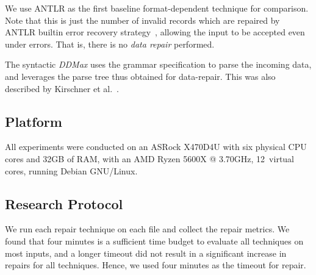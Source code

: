 \documentclass[acmsmall,screen,review,anonymous]{acmart}
\newcommand{\formatfree}{format-free\xspace}
\newcommand{\formatdependent}{format-dependent\xspace}
\newcommand{\dtask}{data repair\xspace}
\newcommand{\approach}{\textsc{$\Delta$Repair}\xspace}
\newcommand{\ddmax}{\textit{DDMax}\xspace}
\newcommand{\drepair}{\approach}
\begin{document}
\begin{description}[wide]
\item[\textbf{(3) ANTLR:}] We use ANTLR as the first baseline \formatdependent
  technique for comparison. Note that this is just the number of invalid records
  which are repaired by ANTLR builtin error recovery strategy~\cite{parr2013definitive},
  allowing the input to be accepted even under errors. That is, there is no
  \emph{\dtask} performed.

\item[\textbf{(4) Syntactic \ddmax:}] The syntactic \ddmax uses the
  grammar specification to parse the incoming data, and leverages the parse
  tree thus obtained for data-repair.
  This was also described by Kirschner et al.~\cite{kirschner2020debugging}.
\end{description}

\subsection{Platform}
All experiments were conducted
on an ASRock X470D4U with six physical CPU cores and 32GB of RAM, with an AMD Ryzen 5600X @ 3.70GHz, 12~virtual cores, running Debian GNU/Linux.


\subsection{Research Protocol}
We run each repair technique on each file and collect the repair metrics.
We found that four minutes is a sufficient time budget to evaluate all
techniques on most inputs, and a longer timeout did not result in a
significant increase in repairs for all techniques. Hence, we used four
minutes as the timeout for repair.


% 
% 
% 
\end{document}
